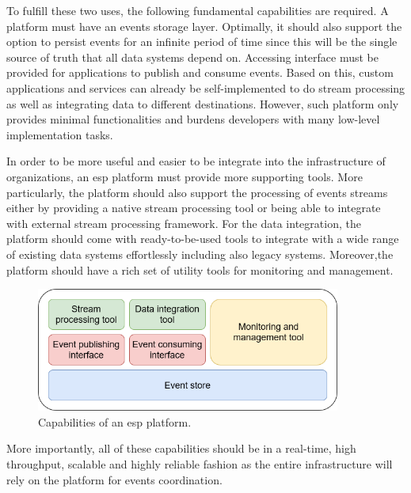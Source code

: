 To fulfill these two uses, the following fundamental capabilities are required. A platform must have an events storage layer. Optimally, it should also support the option to persist events for an infinite period of time since this will be the single source of truth that all data systems depend on. Accessing interface must be provided for applications to publish and consume events. Based on this, custom applications and services can already be self-implemented to do stream processing as well as integrating data to different destinations. However, such platform only provides minimal functionalities and burdens developers with many low-level implementation tasks.

In order to be more useful and easier to be integrate into the infrastructure of organizations, an \acrshort{esp} platform must provide more supporting tools. More particularly, the platform should also support the processing of events streams either by providing a native stream processing tool or being able to integrate with external stream processing framework. For the data integration, the platform should come with ready-to-be-used tools to integrate with a wide range of existing data systems effortlessly including also legacy systems. Moreover,the platform should have a rich set of utility tools for monitoring and management.

\begin{figure}[h]
	\centering
	\includegraphics[width=10cm]{images/espplatform.png}
	\caption{Capabilities of an \acrshort{esp} platform.}
	\label{fig:espplatform}
\end{figure}


More importantly, all of these capabilities should be in a real-time, high throughput, scalable and highly reliable fashion as the entire infrastructure will rely on the platform for events coordination. 




